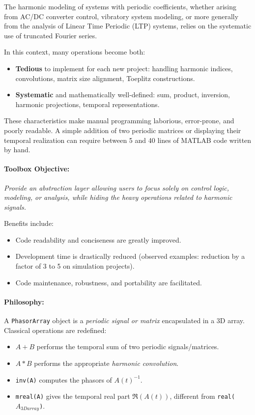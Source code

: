\documentclass[11pt,a4paper]{article}
\begin{document}
The harmonic modeling of systems with periodic coefficients, whether arising from AC/DC converter control, vibratory system modeling, or more generally from the analysis of Linear Time Periodic (LTP) systems, relies on the systematic use of truncated Fourier series.

In this context, many operations become both:
\begin{itemize}
    \item \textbf{Tedious} to implement for each new project: handling harmonic indices, convolutions, matrix size alignment, Toeplitz constructions.
    \item \textbf{Systematic} and mathematically well-defined: sum, product, inversion, harmonic projections, temporal representations.
\end{itemize}

These characteristics make manual programming laborious, error-prone, and poorly readable. A simple addition of two periodic matrices or displaying their temporal realization can require between 5 and 40 lines of MATLAB code written by hand.

\paragraph{Toolbox Objective:} \textit{Provide an abstraction layer allowing users to focus solely on control logic, modeling, or analysis, while hiding the heavy operations related to harmonic signals.}

Benefits include:
\begin{itemize}
    \item Code readability and conciseness are greatly improved.
    \item Development time is drastically reduced (observed examples: reduction by a factor of 3 to 5 on simulation projects).
    \item Code maintenance, robustness, and portability are facilitated.
\end{itemize}

\paragraph{Philosophy:} 
A \texttt{PhasorArray} object is a \textit{periodic signal or matrix} encapsulated in a 3D array. Classical operations are redefined:
\begin{itemize}
    \item $A+B$ performs the temporal sum of two periodic signals/matrices.
    \item $A*B$ performs the appropriate \textit{harmonic convolution}.
    \item \texttt{inv(A)} computes the phasors of $A(t)^{-1}$.
    \item \texttt{mreal(A)} gives the temporal real part $\Re(A(t))$, different from \texttt{real($A_{3Darray}$)}.
\end{itemize}
\end{document}
